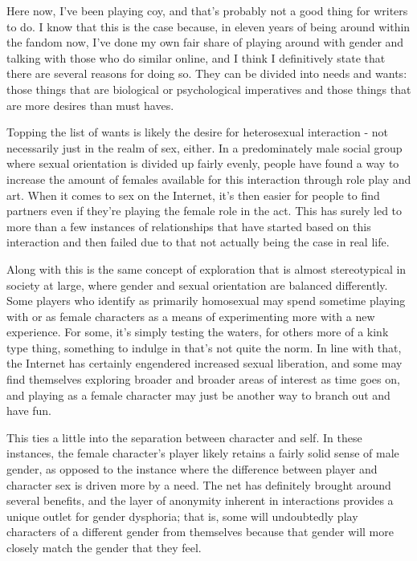 Here now, I've been playing coy, and that's probably not a good thing for writers to do. I know that this is the case because, in eleven years of being around within the fandom now, I've done my own fair share of playing around with gender and talking with those who do similar online, and I think I definitively state that there are several reasons for doing so. They can be divided into needs and wants: those things that are biological or psychological imperatives and those things that are more desires than must haves.

Topping the list of wants is likely the desire for heterosexual interaction - not necessarily just in the realm of sex, either. In a predominately male social group where sexual orientation is divided up fairly evenly, people have found a way to increase the amount of females available for this interaction through role play and art. When it comes to sex on the Internet, it's then easier for people to find partners even if they're playing the female role in the act. This has surely led to more than a few instances of relationships that have started based on this interaction and then failed due to that not actually being the case in real life.

Along with this is the same concept of exploration that is almost stereotypical in society at large, where gender and sexual orientation are balanced differently. Some players who identify as primarily homosexual may spend sometime playing with or as female characters as a means of experimenting more with a new experience. For some, it's simply testing the waters, for others more of a kink type thing, something to indulge in that's not quite the norm. In line with that, the Internet has certainly engendered increased sexual liberation, and some may find themselves exploring broader and broader areas of interest as time goes on, and playing as a female character may just be another way to branch out and have fun.

This ties a little into the separation between character and self. In these instances, the female character's player likely retains a fairly solid sense of male gender, as opposed to the instance where the difference between player and character sex is driven more by a need. The net has definitely brought around several benefits, and the layer of anonymity inherent in interactions provides a unique outlet for gender dysphoria; that is, some will undoubtedly play characters of a different gender from themselves because that gender will more closely match the gender that they feel.

